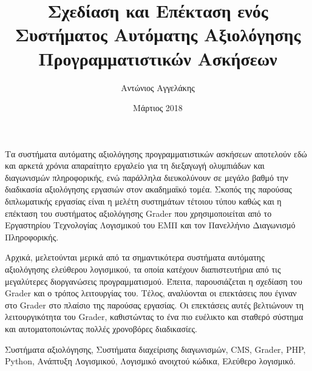 \documentclass[diploma]{softlab-thesis}
\begin{document}

\frontmatter

\title{Σχεδίαση και Επέκταση ενός Συστήματος Αυτόματης Αξιολόγησης Προγραμματιστικών Ασκήσεων}
\author{Αντώνιος Αγγελάκης}
\date{Μάρτιος 2018}




\maketitle



\begin{abstractgr}%

  Τα συστήματα αυτόματης αξιολόγησης προγραμματιστικών ασκήσεων αποτελούν εδώ
  και αρκετά χρόνια απαραίτητο εργαλείο για τη διεξαγωγή ολυμπιάδων και
  διαγωνισμών πληροφορικής, ενώ παράλληλα διευκολύνουν σε μεγάλο βαθμό την
  διαδικασία αξιολόγησης εργασιών στον ακαδημαϊκό τομέα. Σκοπός της παρούσας
  διπλωματικής εργασίας είναι η μελέτη συστημάτων τέτοιου τύπου καθώς και η
  επέκταση του συστήματος αξιολόγησης Grader που χρησιμοποιείται από το
  Εργαστηρίου Τεχνολογίας Λογισμικού του ΕΜΠ και τον Πανελλήνιο Διαγωνισμό
  Πληροφορικής.

  \bigskip

  Αρχικά, μελετούνται μερικά από τα σημαντικότερα συστήματα αυτόματης
  αξιολόγησης ελεύθερου λογισμικού, τα οποία κατέχουν διαπιστευτήρια από τις
  μεγαλύτερες διοργανώσεις προγραμματισμού. Έπειτα, παρουσιάζεται η σχεδίαση
  του Grader και ο τρόπος λειτουργίας του. Τέλος, αναλύονται οι επεκτάσεις που
  έγιναν στο Grader στο πλαίσιο της παρούσας εργασίας. Οι επεκτάσεις αυτές
  βελτιώνουν τη λειτουργικότητα του Grader, καθιστώντας το ένα πιο ευέλικτο και
  σταθερό σύστημα και αυτοματοποιώντας πολλές χρονοβόρες διαδικασίες.

\begin{keywordsgr}
Συστήματα αξιολόγησης, Συστήματα διαχείρισης διαγωνισμών, CMS, Grader, PHP,
Python, Ανάπτυξη Λογισμικού, Λογισμικό ανοιχτού κώδικα, Ελεύθερο λογισμικό.
\end{keywordsgr}
\end{abstractgr}
\end{document}
